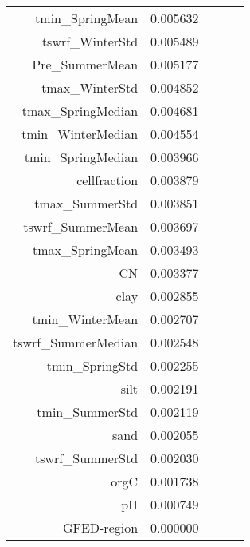 \begin{table}[h]
\begin{tabular}{rrrrr}
tmin_SpringMean & 0.005632 \\
tswrf_WinterStd & 0.005489 \\
Pre_SummerMean & 0.005177 \\
tmax_WinterStd & 0.004852 \\
tmax_SpringMedian & 0.004681 \\
tmin_WinterMedian & 0.004554 \\
tmin_SpringMedian & 0.003966 \\
cellfraction & 0.003879 \\
tmax_SummerStd & 0.003851 \\
tswrf_SummerMean & 0.003697 \\
tmax_SpringMean & 0.003493 \\
CN & 0.003377 \\
clay & 0.002855 \\
tmin_WinterMean & 0.002707 \\
tswrf_SummerMedian & 0.002548 \\
tmin_SpringStd & 0.002255 \\
silt & 0.002191 \\
tmin_SummerStd & 0.002119 \\
sand & 0.002055 \\
tswrf_SummerStd & 0.002030 \\
orgC & 0.001738 \\
pH & 0.000749 \\
GFED-region & 0.000000 \\
\bottomrule
\end{tabular}
\end{table}
